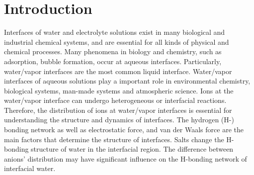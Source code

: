 \chapter{Introduction}\label{CHAPETR_1}
Interfaces of water and electrolyte solutions exist in many biological and industrial chemical systems, and
are essential for all kinds of physical \cite{Yamamoto2008, Salmeron2009,Balajka2018} and chemical processes. \cite{Tobias99,Benderskii00,Benderskii02}
Many phenomena in biology and chemistry, such as adsorption,
bubble formation, occur at aqueous interfaces. \cite{Ball2008}
Particularly, water/vapor interfaces are the most common liquid interface. \cite{Kuo2004b} 
Water/vapor interfaces of aqueous solutions play a important role in environmental chemistry, biological systems, \cite{ZhangLY09,Nostro12} 
man-made systems \cite{Richmond02,LiuH04,Asahi01} and atmospheric science. \cite{TianCS08,Irwin88} 
Ions at the water/vapor interface can undergo heterogeneous or interfacial reactions. \cite{HuJH95,LiuDF04,Clifford07,Manna13,Pillar2014}
Therefore, the distribution of ions at water/vapor interfaces is essential for understanding the structure and dynamics of interfaces. 
The hydrogen (H-) bonding network \cite{Eisenberg1969,Speedy1976,Poole1992,Soper2008,Nilsson2011,Ball2001,Pettersson2015} as well as electrostatic force, and van der Waals force are the main factors that determine the structure of interfaces. 
Salts change the H-bonding structure of water in the interfacial region. \cite{EAR04,McLain2006,Ball2008} 
The difference between anions' distribution may have significant influence on the H-bonding network of interfacial water. \cite{Morita2008}

